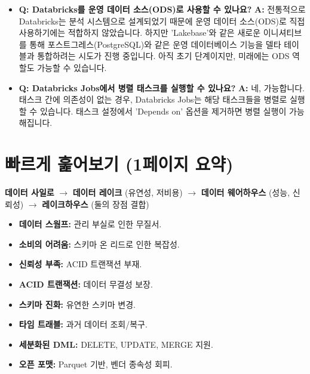 \documentclass[11pt,a4paper]{article}
\begin{document}
\begin{tcolorbox}[title=\textbf{초심자를 위한 FAQ}, colback=yellow!5!white, colframe=yellow!75!black, sharp corners, boxrule=0.8pt]
\begin{itemize}
    \item \textbf{Q: Databricks를 운영 데이터 소스(ODS)로 사용할 수 있나요?}
    \textbf{A:} 전통적으로 Databricks는 분석 시스템으로 설계되었기 때문에 운영 데이터 소스(ODS)로 직접 사용하기에는 적합하지 않았습니다. 하지만 'Lakebase'와 같은 새로운 이니셔티브를 통해 포스트그레스(PostgreSQL)와 같은 운영 데이터베이스 기능을 델타 테이블과 통합하려는 시도가 진행 중입니다. 아직 초기 단계이지만, 미래에는 ODS 역할도 가능할 수 있습니다.

    \item \textbf{Q: Databricks Jobs에서 병렬 태스크를 실행할 수 있나요?}
    \textbf{A:} 네, 가능합니다. 태스크 간에 의존성이 없는 경우, Databricks Jobs는 해당 태스크들을 병렬로 실행할 수 있습니다. 태스크 설정에서 'Depends on' 옵션을 제거하면 병렬 실행이 가능해집니다.
\end{itemize}
\end{tcolorbox}

\newpage
\section*{빠르게 훑어보기 (1페이지 요약)}

\begin{tcolorbox}[title=\textbf{데이터 아키텍처의 진화}, colback=blue!5!white, colframe=blue!75!black, sharp corners, boxrule=0.8pt]
\textbf{데이터 사일로} $\rightarrow$ \textbf{데이터 레이크} (유연성, 저비용) $\rightarrow$ \textbf{데이터 웨어하우스} (성능, 신뢰성) $\rightarrow$ \textbf{레이크하우스} (둘의 장점 결합)
\end{tcolorbox}

\begin{tcolorbox}[title=\textbf{데이터 레이크의 문제점}, colback=red!5!white, colframe=red!75!black, sharp corners, boxrule=0.8pt]
\begin{itemize}
    \item \textbf{데이터 스웜프:} 관리 부실로 인한 무질서.
    \item \textbf{소비의 어려움:} 스키마 온 리드로 인한 복잡성.
    \item \textbf{신뢰성 부족:} ACID 트랜잭션 부재.
\end{itemize}
\end{tcolorbox}

\begin{tcolorbox}[title=\textbf{델타 레이크: 레이크하우스의 핵심}, colback=green!5!white, colframe=green!75!black, sharp corners, boxrule=0.8pt]
\begin{itemize}
    \item \textbf{ACID 트랜잭션:} 데이터 무결성 보장.
    \item \textbf{스키마 진화:} 유연한 스키마 변경.
    \item \textbf{타임 트래블:} 과거 데이터 조회/복구.
    \item \textbf{세분화된 DML:} DELETE, UPDATE, MERGE 지원.
    \item \textbf{오픈 포맷:} Parquet 기반, 벤더 종속성 회피.
\end{itemize}
\end{tcolorbox}
\end{document}
